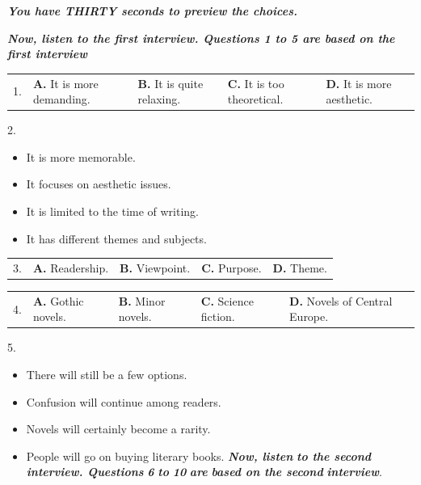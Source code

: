 \documentclass[UTF8,11pt]{ctexart}
\begin{document}
\textbf{\textit{You have THIRTY seconds to preview the choices.}}


\textbf{\textit{Now, listen to the first interview. Questions 1 to 5 are based on the first interview}}


\noindent\begin{tabularx}{\linewidth}{@{}lXXXX@{}}1. & \textbf{A.} It is more demanding. & \textbf{B.} It is quite relaxing. & \textbf{C.} It is too theoretical. & \textbf{D.} It is more aesthetic.\\\end{tabularx}\par

2.


\begin{itemize}[leftmargin=2em,itemsep=.2em,topsep=.4em]\item[A.] It is more memorable.
\item[B.] It focuses on aesthetic issues.
\item[C.] It is limited to the time of writing.
\item[D.] It has different themes and subjects.
\end{itemize}

\noindent\begin{tabularx}{\linewidth}{@{}lXXXX@{}}3. & \textbf{A.} Readership. & \textbf{B.} Viewpoint. & \textbf{C.} Purpose. & \textbf{D.} Theme.\\\end{tabularx}\par

\noindent\begin{tabularx}{\linewidth}{@{}lXXXX@{}}4. & \textbf{A.} Gothic novels. & \textbf{B.} Minor novels. & \textbf{C.} Science fiction. & \textbf{D.} Novels of Central Europe.\\\end{tabularx}\par

5.


\begin{itemize}[leftmargin=2em,itemsep=.2em,topsep=.4em]\item[A.] There will still be a few options.
\item[B.] Confusion will continue among readers.
\item[C.] Novels will certainly become a rarity.
\item[D.] People will go on buying literary books. \textbf{\textit{Now, listen}} \textbf{\textit{to the second}} \textbf{\textit{interview. Questions}} \textbf{\textit{6}} \textbf{\textit{to}} \textbf{\textit{10}} \textbf{\textit{are}} \textbf{\textit{based on the second}} \textbf{\textit{interview}}.
\end{itemize}
\end{document}
